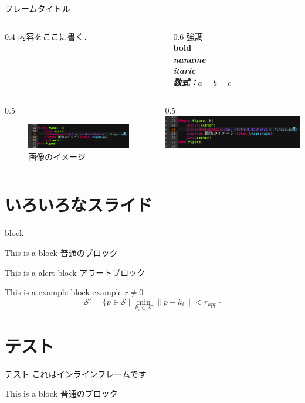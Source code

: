 \documentclass[dvipdfmx, a4p, cjk]{beamer}
\newcommand{\inlineframe}[2]{\section{#1}\begin{frame}{#1}#2\end{frame}}
\begin{document}
\begin{frame}{フレームタイトル}
\begin{columns}
    \begin{column}{0.4\hsize}
    内容をここに書く．
    \end{column}
    \begin{column}{0.6\hsize}
    \alert{強調}\\
    \bf{bold}\\
    \sl{naname}\\
    \it{itaric}\\
    数式：$a=b=c$
    \end{column}
\end{columns}

\begin{columns}
    \begin{column}{0.5\hsize}
        \begin{figure}[b]
            \begin{center}
            \includegraphics[clip, width=1\hsize]{./img/image.png}
            \caption{画像のイメージ\label{imageimage}}
            \end{center}
        \end{figure}
    \end{column}
    \begin{column}{0.5\hsize}
        \includegraphics[clip, width=1\hsize]{./img/image.png}

    \end{column}
\end{columns}

\end{frame}


\section{いろいろなスライド}
\begin{frame}{block}
    \begin{block}{This is a block}
        普通のブロック
    \end{block}
    \begin{alertblock}{This is a alert block}
        アラートブロック
    \end{alertblock}
    \begin{exampleblock}{This is a example block}
        example
        $r \neq 0$
        \[ \mathcal{S}' = \{ p \in \mathcal{S} \mid \min_{k_i \in \mathcal{K}} \|p - k_i\| < r_{kpp} \} \]
    \end{exampleblock}
\end{frame}

\inlineframe{テスト}{
    これはインラインフレームです
    \begin{block}{This is a block}
        普通のブロック
    \end{block}
}
\end{document}
